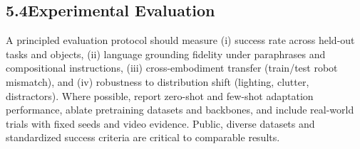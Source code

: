\subsection*{5.4\quad Experimental Evaluation}
A principled evaluation protocol should measure (i) success rate across held-out tasks and objects, (ii) language grounding fidelity under paraphrases and compositional instructions, (iii) cross-embodiment transfer (train/test robot mismatch), and (iv) robustness to distribution shift (lighting, clutter, distractors). Where possible, report zero-shot and few-shot adaptation performance, ablate pretraining datasets and backbones, and include real-world trials with fixed seeds and video evidence. Public, diverse datasets and standardized success criteria are critical to comparable results.